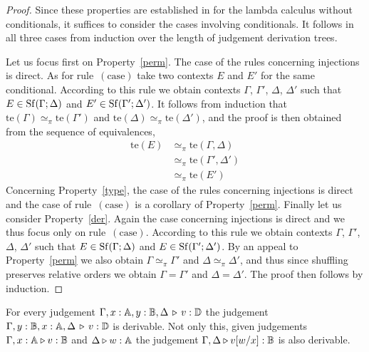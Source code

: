 \begin{proof}
Since these properties are established in \cite[Theorem 2.3]{dahlqvistCompleteVEquationalSystem2023} for the lambda calculus without conditionals,  it suffices to consider the cases involving conditionals.
It follows in all three cases from induction over the length of judgement derivation
trees. 

Let us focus first on Property~\eqref{perm}. The case of the rules concerning
injections is direct. As for rule~$(\text{case})$ take two contexts $E$ and
$E'$ for the same conditional. According to this rule we obtain contexts
$\Gamma$, $\Gamma'$, $\Delta$, $\Delta'$ such that $E \in
\mathrm{Sf}(\Gamma;\Delta)$ and $E' \in \mathrm{Sf}(\Gamma';\Delta')$. It follows from
induction that  $\text{te}(\Gamma) \simeq_\pi \text{te}(\Gamma')$ and $\text{te}(\Delta) \simeq_\pi \text{te}(\Delta')$,
and the proof is then obtained from the sequence of equivalences,
\begin{align*}
        \text{te}(E) & \simeq_\pi \text{te}(\Gamma, \Delta) 
        \\
        & \simeq_\pi \text{te}(\Gamma', \Delta')
        \\
        & \simeq_\pi \text{te}(E')
\end{align*}
Concerning Property~\eqref{type}, the case of the rules concerning injections
is direct and the case of rule~$(\text{case})$ is a corollary of
Property~\eqref{perm}. Finally let us consider Property~\eqref{der}. Again the
case concerning injections is direct and we thus focus only on
rule~$(\text{case})$. According to this rule we obtain contexts $\Gamma$,
$\Gamma'$, $\Delta$, $\Delta'$ such that $E \in \mathrm{Sf}(\Gamma;\Delta)$ and $E
\in \mathrm{Sf}(\Gamma';\Delta')$. By an appeal to Property~\eqref{perm} we also
obtain $\Gamma \simeq_\pi \Gamma'$ and $\Delta \simeq_\pi \Delta'$, and thus
since shuffling preserves relative orders we obtain $\Gamma = \Gamma'$ and
$\Delta = \Delta'$. The proof then follows by induction.
\end{proof}


\begin{lemma}
\label{lem:exh_and_sub} 
For every judgement $\Gamma,x: \mathbb{A}, y: \mathbb{B}, \Delta \, \triangleright \, v: \mathbb{D}$ the
judgement $\Gamma, y:\mathbb{B}, x:\mathbb{A}, \Delta \, \triangleright \, v:
\mathbb{D}$ is derivable. Not only this, given judgements  $\Gamma,x:\mathbb{A} \triangleright
v: \mathbb{B}$ and $\Delta \triangleright w: \mathbb{A}$ the judgement $\Gamma, \Delta \triangleright
v[w/x]: \mathbb{B}$ is also derivable.
\end{lemma}

